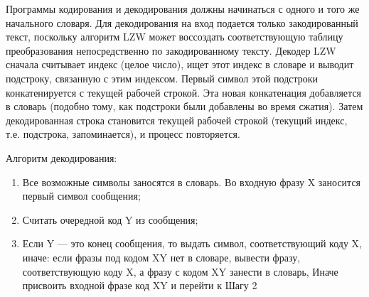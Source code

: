 Программы кодирования и декодирования должны начинаться с одного и того же начального словаря. Для декодирования на вход подается только закодированный текст, поскольку алгоритм LZW может воссоздать соответствующую таблицу преобразования непосредственно по закодированному тексту. Декодер LZW сначала считывает индекс (целое число), ищет этот индекс в словаре и выводит подстроку, связанную с этим индексом. Первый символ этой подстроки конкатенируется с текущей рабочей строкой. Эта новая конкатенация добавляется в словарь (подобно тому, как подстроки были добавлены во время сжатия). Затем декодированная строка становится текущей рабочей строкой (текущий индекс, т.е. подстрока, запоминается), и процесс повторяется.

Алгоритм декодирования:
\begin{enumerate}
	\item Все возможные символы заносятся в словарь. Во входную фразу X заносится первый символ сообщения;
	\item Считать очередной код Y из сообщения;
	\item Если Y --- это конец сообщения, то выдать символ, соответствующий коду X, иначе: если фразы под кодом XY нет в словаре, вывести фразу, соответствующую коду X, а фразу с кодом XY
	занести в словарь, Иначе присвоить входной фразе код XY и перейти к Шагу 2
\end{enumerate}










